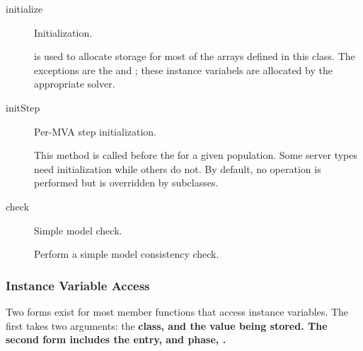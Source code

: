 \begin{description}
\item[initialize] \texonly{---} Initialization.\\

   is used to allocate storage for most of the arrays
  defined in this class.  The exceptions are the
    and ; these instance
  variabels are allocated by the appropriate  solver.

  \label{sec:server-initstep}
\item[initStep] \texonly{---} Per-MVA step initialization.\\

  This method is called before the  for a
  given population.  Some server types need initialization while others
  do not.  By default, no operation is performed but is overridden by
  subclasses.

\item[check] \texonly{---} Simple model check.\\

  Perform a simple model consistency check.
\end{description}

\subsubsection{Instance Variable Access}

Two forms exist for most member functions that access instance
variables.  The first takes two arguments: the \bf{class},  and the
value being stored.  The second form includes the \bf{entry},  and
\bf{phase}, . 

